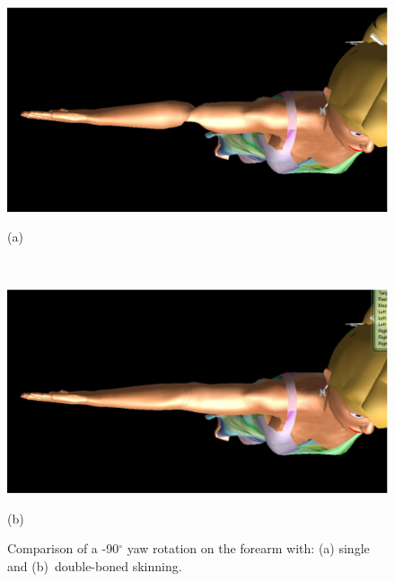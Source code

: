 \documentclass[number,preprint,review,12pt]{elsarticle}
\begin{document}
\begin{figure}[htbp]
	\centerline{\includegraphics[width=1.0\columnwidth]{./figures/fore-arm-single-bone.eps}}
	\centerline{(a)}
	\centerline{\ }
	\centerline{\includegraphics[width=1.0\columnwidth]{./figures/fore-arm-double-bone.eps}}
	\centerline{(b)}
	\caption{Comparison of a -90$^\circ$ yaw rotation on the forearm with: (a) single and (b)~double-boned skinning.}
	\label{fig:forearm-comparison}
\end{figure}
\end{document}
